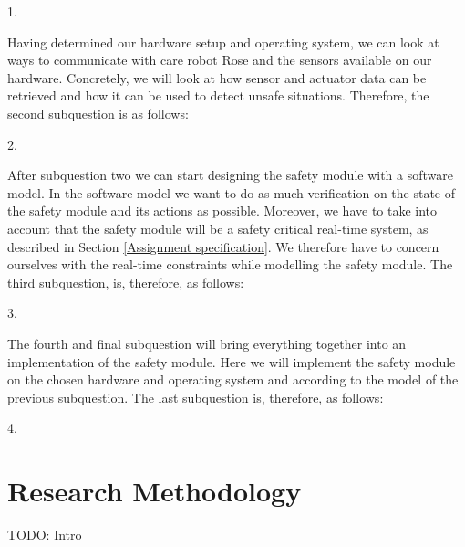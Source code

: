 \documentclass[12pt]{scrreprt}
\begin{document}
\begin{flushleft}
1. \textit{\sqone}
\end{flushleft}

%

Having determined our hardware setup and operating system, we can look at ways to communicate with care robot Rose and the sensors available on our hardware. Concretely, we will look at how sensor and actuator data can be retrieved and how it can be used to detect unsafe situations. Therefore, the second subquestion is as follows:

\begin{flushleft}
2. \textit{\sqtwo}
\end{flushleft}

After subquestion two we can start designing the safety module with a software model. In the software model we want to do as much verification on the state of the safety module and its actions as possible. Moreover, we have to take into account that the safety module will be a safety critical real-time system, as described in Section \ref{Assignment specification}.
We therefore have to concern ourselves with the real-time constraints while modelling the safety module. The third subquestion, is, therefore, as follows:

\begin{flushleft}
3. \textit{\sqthree}
\end{flushleft}

The fourth and final subquestion will bring everything together into an implementation of the safety module. Here we will implement the safety module on the chosen hardware and operating system and according to the model of the previous subquestion. The last subquestion is, therefore, as follows:

\begin{flushleft}
4. \textit{\sqfour}
\end{flushleft}

\chapter{Research Methodology}
\label{Research Methodology}
TODO: Intro
\end{document}
